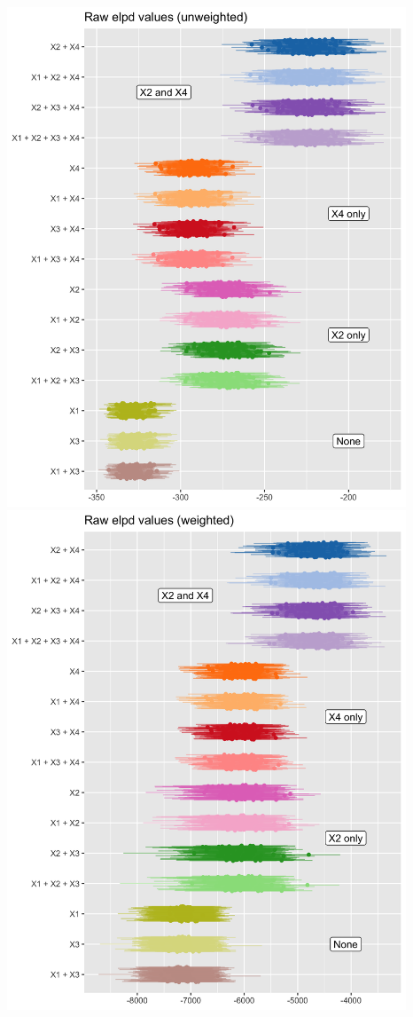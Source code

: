 \documentclass[
]{article}
\begin{document}
\includegraphics[width=4.6875in,height=\textheight]{images/3b/plot_loo_raw_unwtd.png}
\includegraphics[width=4.6875in,height=\textheight]{images/3b/plot_loo_raw_wtd.png}
\end{document}
